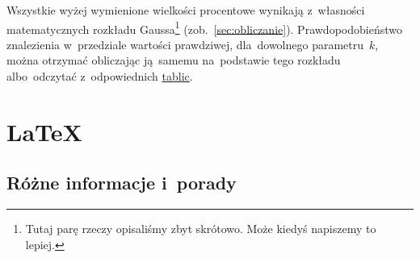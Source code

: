 \documentclass[a4paper,11pt]{article}
\begin{document}
\begin{enumerate}
  Wszystkie wyżej wymienione wielkości procentowe wynikają z~własności
  matematycznych rozkładu Gaussa\footnote{Tutaj parę rzeczy opisaliśmy
    zbyt skrótowo. Może kiedyś napiszemy to lepiej.}
  (zob.~\eqref{sec:obliczanie}). Prawdopodobieństwo znalezienia
  w~przedziale wartości prawdziwej, dla~dowolnego parametru~$k$, można
  otrzymać obliczając ją~samemu na~podstawie tego rozkładu
  albo~odczytać z~odpowiednich
  \href{https://en.wikipedia.org/wiki/Standard_normal_table}{tablic}.
\end{enumerate}





\section{\LaTeX}


\subsection{Różne informacje i~porady}
\end{document}
